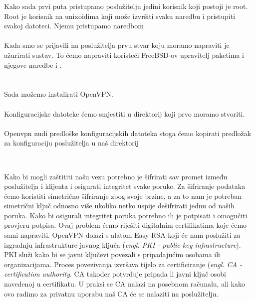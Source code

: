     Kako sada prvi puta pristupamo poslužitelju jedini korisnik
    koji postoji je root. Root je korisnik na unixoidima koji može izvršiti
    svaku naredbu i pristupiti svakoj datoteci. Njemu pristupamo naredbom \\
    
    \noindent
     \\

    Kada smo se prijavili na poslužitelja prvu stvar koju moramo napraviti je
    ažurirati sustav. To ćemo napraviti koristeći FreeBSD-ov upravitelj
    paketima  i njegove naredbe  i . \\

    \noindent
     \\
     \\

    Sada možemo instalirati OpenVPN. \\

    \noindent
     \\

    Konfiguracijske datoteke ćemo smjestiti u direktorij
     koji prvo moramo stvoriti. \\

    \noindent
     \\

    \noindent
    Openvpn nudi predloške konfiguracijskih datoteka stoga ćemo kopirati
    predložak za konfiguraciju poslužitelja u naš direktorij

    \noindent
     \\

        Kako bi mogli zaštititi našu vezu potrebno je šifrirati sav promet
        između poslužitelja i klijenta i osigurati integritet svake poruke.
        Za šifriranje podataka ćemo koristiti simetrično šifriranje zbog svoje
        brzine, a za to nam je potreban simetrični ključ odnosno više ukoliko
        netko uspije dešifrirati jednu od naših poruka. Kako bi osigurali
        integritet poruka potrebno ih je potpisati i omogućiti provjeru
        potpisa. Ovaj problem ćemo riješiti digitalnim certifikatima koje ćemo
        sami napraviti. OpenVPN dolazi s alatom Easy-RSA koji će nam poslužiti za izgradnju
        infrastrukture javnog ključa (\textit{engl. PKI - public key
        infrastructure}). PKI služi kako bi se javni ključevi povezali s
        pripadajućim osobama ili organizacijama. Proces povezivanja izvršava
        tijelo za certificiranje (\textit{engl. CA - certification authority}.
        CA također potvrđuje pripada li javni ključ osobi navedenoj u
        certifikatu. U praksi se CA nalazi na posebnom računalu, ali kako ovo
        radimo za privatnu uporabu naš CA će se nalaziti na poslužitelju.

